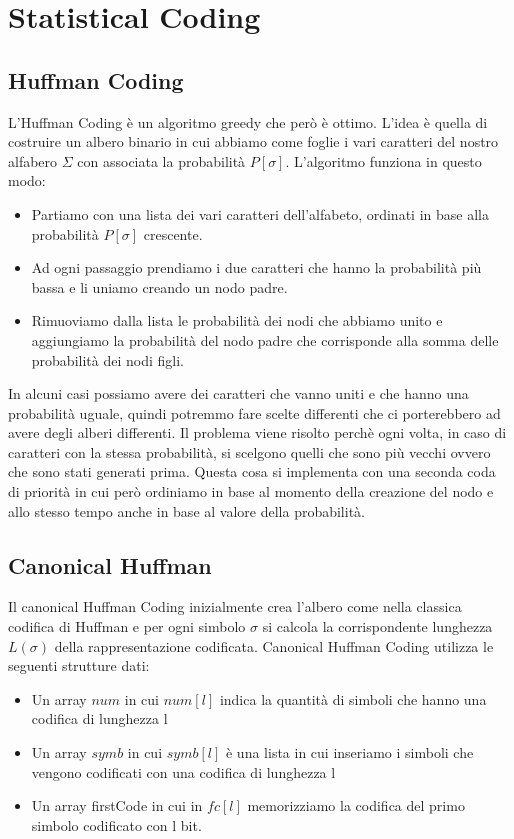 \documentclass[12pt]{article}
\begin{document}
\section{Statistical Coding}

\subsection{Huffman Coding}

L'Huffman Coding è un algoritmo greedy che però è ottimo.
L'idea è quella di costruire un albero binario in cui abbiamo come foglie i vari caratteri del nostro alfabero $\Sigma$ con associata la probabilità $P[\sigma]$. 
L'algoritmo funziona in questo modo:
\begin{itemize}
\item Partiamo con una lista dei vari caratteri dell'alfabeto, ordinati in base alla probabilità $P[\sigma]$ crescente.
\item Ad ogni passaggio prendiamo i due caratteri che hanno la probabilità più bassa e li uniamo creando un nodo padre.
\item Rimuoviamo dalla lista le probabilità dei nodi che abbiamo unito e aggiungiamo la probabilità del nodo padre che corrisponde alla somma delle probabilità dei nodi figli.
\end{itemize}

In alcuni casi possiamo avere dei caratteri che vanno uniti e che hanno una probabilità uguale, quindi potremmo fare scelte differenti che ci porterebbero ad avere degli alberi differenti.
Il problema viene risolto perchè ogni volta, in caso di caratteri con la stessa probabilità, si scelgono quelli che sono più vecchi ovvero che sono stati generati prima. Questa cosa si implementa con una seconda coda di priorità in cui però ordiniamo in base al momento della creazione del nodo e allo stesso tempo anche in base al valore della probabilità.

\subsection{Canonical Huffman}

Il canonical Huffman Coding inizialmente crea l'albero come nella classica codifica di Huffman e per ogni simbolo $\sigma$ si calcola la corrispondente lunghezza $L(\sigma)$ della rappresentazione codificata. 
Canonical Huffman Coding utilizza le seguenti strutture dati:
\begin{itemize}
\item Un array $num$ in cui $num[l]$ indica la quantità di simboli che hanno una codifica di lunghezza l
\item Un array $symb$ in cui $symb[l]$ è una lista in cui inseriamo i simboli che vengono codificati con una codifica di lunghezza l
\item Un array firstCode in cui in $fc[l]$ memorizziamo la codifica del primo simbolo codificato con l bit.
\end{itemize}
\end{document}
